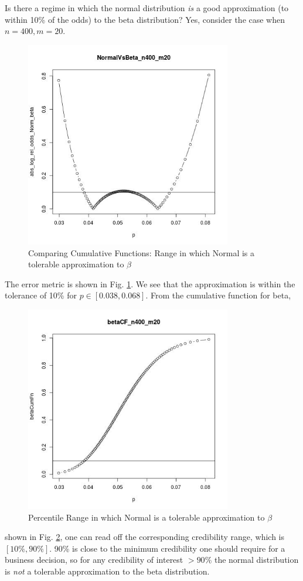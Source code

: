 \documentclass[12pt]{report}
\begin{document}
Is there a regime in which the normal distribution {\em is} a good
approximation (to within 10\% of the odds) to the beta distribution? Yes,
consider the case when \(n=400, m=20\).
\begin{figure}[ht!]
\centering
\includegraphics[width=90mm]{NormalVsBeta_n400_m20}
\caption{Comparing Cumulative Functions: Range in which Normal is a
tolerable approximation to \(\beta\) \label{fig:NormalVsBeta_400_20}}
\end{figure}
The error metric is shown in Fig. \ref{fig:NormalVsBeta_400_20}.
We see that the approximation is within the tolerance of 10\% for
\(p\in[0.038,0.068]\). From the cumulative function for beta,
\begin{figure}[ht!]
\centering
\includegraphics[width=90mm]{betaCF_n400_m20}
\caption{Percentile Range in which Normal is a
tolerable approximation to \(\beta\)  \label{fig:betaCF_400_20}}
\end{figure}
shown in Fig. \ref{fig:betaCF_400_20},
one can read off the corresponding credibility range, which is \([10\%,90\%]\).
90\% is close to the minimum credibility one should require for a
business decision, so for any credibility of interest \(>90\%\) the
normal distribution is {\em not} a tolerable
approximation to the beta distribution.
\end{document}
